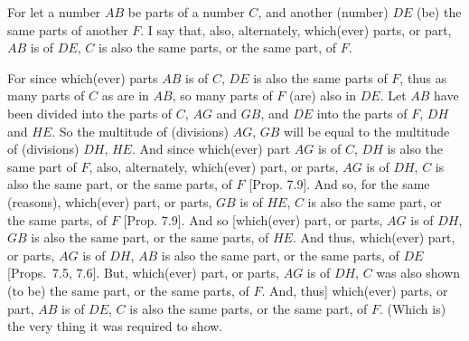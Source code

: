 \begin{Parallel}{}{}
{For let a number $AB$ be parts of a number $C$, and another (number)
$DE$ (be) the same parts of another $F$. I say that, also, alternately, which(ever)
parts, or part, $AB$ is of $DE$, $C$ is also the same parts, or the same part,
of $F$.

\epsfysize=2in
\centerline{}

For since which(ever) parts $AB$ is of $C$, $DE$ is also the same parts of $F$,
thus as many parts of $C$ as are in $AB$, so many parts of $F$ (are)
also in $DE$. Let $AB$ have been divided into the parts of $C$, $AG$ and $GB$, and
$DE$ into the parts of $F$, $DH$ and $HE$.  So the multitude of
(divisions) $AG$, $GB$ will be equal to the multitude of (divisions) $DH$, $HE$.
And since which(ever) part $AG$ is of $C$, $DH$ is also the same part of $F$,
also, alternately, which(ever) part, or parts, $AG$ is
of $DH$, $C$ is also the same part, or the same parts, of $F$  [Prop. 7.9]. And so, for the same (reasons), 
which(ever) part, or parts, $GB$ is of $HE$, $C$ is also the same
part, or the same parts, of $F$ [Prop. 7.9]. And so [which(ever) part, or parts, $AG$ is of
$DH$, $GB$ is also the same part, or the same parts, of $HE$. And thus,
which(ever) part, or parts, $AG$ is of $DH$, $AB$ is also the same part, or the
same parts, of $DE$ [Props.~7.5, 7.6]. But, which(ever) part, or parts, $AG$ is of $DH$, $C$ was also
shown (to be) the same part, or the same parts, of $F$. And, thus] which(ever)
parts, or part, $AB$ is of $DE$, $C$ is also the  same parts, or the same part, of $F$. (Which
is) the very thing it was required to show.}
\end{Parallel}


\vspace{7pt}{\footnotesize\noindent$^\dag$ In modern notation, this
proposition states that if $a=(m/n)\,b$ and $c=(m/n)\,d$ then if $a=(k/l)\,c$
then $b = (k/l)\,d$, where all symbols denote numbers.}

